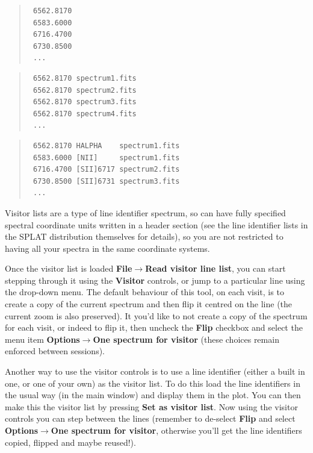 \documentclass[twoside,11pt]{article}
\newcommand{\latexhtml}[2]{#1}
\renewcommand{\_}{\texttt{\symbol{95}}}
\newcommand{\submenuitem}[2]{\latexhtml{\textbf{#1$\rightarrow$#2}}{\textbf{#1->#2}}}
\newcommand{\labelitem}[1]{\textbf{#1}}
\begin{document}
\begin{quote}
\begin{verbatim}
 6562.8170
 6583.6000
 6716.4700
 6730.8500
 ...
\end{verbatim}
\end{quote}
\begin{quote}
\begin{verbatim}
 6562.8170 spectrum1.fits
 6562.8170 spectrum2.fits
 6562.8170 spectrum3.fits
 6562.8170 spectrum4.fits
 ...
\end{verbatim}
\end{quote}
\begin{quote}
\begin{verbatim}
 6562.8170 HALPHA    spectrum1.fits
 6583.6000 [NII]     spectrum1.fits
 6716.4700 [SII]6717 spectrum2.fits
 6730.8500 [SII]6731 spectrum3.fits
 ...
\end{verbatim}
\end{quote}

Visitor lists are a type of line identifier spectrum, so can have fully
specified spectral coordinate units written in a header section (see the line
identifier lists in the SPLAT distribution themselves for details), so you are
not restricted to having all your spectra in the same coordinate systems.

Once the visitor list is loaded \submenuitem{File}{Read visitor line list},
you can start stepping through it using the \labelitem{Visitor} controls, or
jump to a particular line using the drop-down menu. The default behaviour of
this tool, on each visit, is to create a copy of the current spectrum and then
flip it centred on the line (the current zoom is also preserved). It you'd
like to not create a copy of the spectrum for each visit, or indeed to flip
it, then uncheck the \labelitem{Flip} checkbox and select the menu item
\submenuitem{Options}{One spectrum for visitor} (these choices remain enforced
between sessions).

Another way to use the visitor controls is to use a line identifier (either a
built in one, or one of your own) as the visitor list. To do this load the
line identifiers in the usual way (in the main window) and display them in the
plot. You can then make this the visitor list by pressing
\labelitem{Set as visitor list}. Now using the visitor controls you can step
between the lines (remember to de-select \labelitem{Flip} and select
\submenuitem{Options}{One spectrum for visitor}, otherwise you'll get the line
identifiers copied, flipped and maybe reused!).
\end{document}
